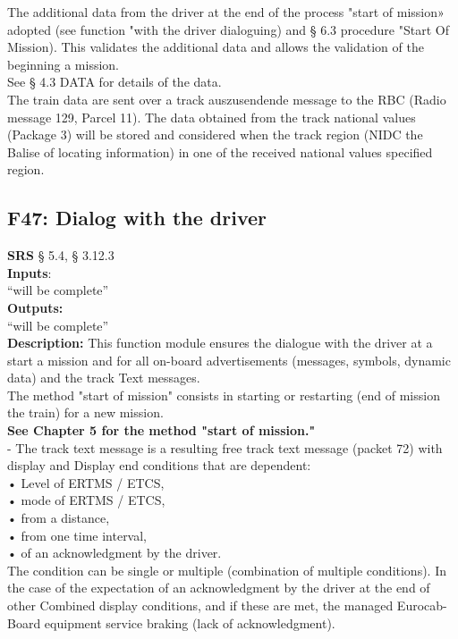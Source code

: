 \documentclass{template/openetcs_report}
\begin{document}
The additional data from the driver at the end of the process "start of mission» 
adopted (see function "with the driver dialoguing) and § 6.3 procedure 
"Start Of Mission). This validates the additional data and allows the validation of the beginning 
a mission. \\

See § 4.3 DATA for details of the data. \\
The train data are sent over a track auszusendende message to the RBC 
(Radio message 129, Parcel 11). 
The data obtained from the track national values ​​(Package 3) will be stored and 
considered when the track region (NIDC the Balise of locating information) in one of the 
received national values ​​specified region.\\

\subsection {F47: Dialog with the driver}
\textbf{SRS} § 5.4, § 3.12.3\\

\textbf{Inputs}:\\
``will be complete''\\
 
 \textbf{Outputs:}\\
 ``will be complete''\\
 
 \textbf{Description:} 
This function module ensures the dialogue with the driver at a start 
a mission and for all on-board advertisements (messages, symbols, dynamic data) and the track 
Text messages. \\

The method "start of mission" consists in starting or restarting (end of mission 
the train) for a new mission. \\

\textbf{See Chapter 5 for the method "start of mission."} \\

- The track text message is a resulting free track text message (packet 72) with display and
Display end conditions that are dependent: \\
    • Level of ERTMS / ETCS, \\
    • mode of ERTMS / ETCS, \\
    • from a distance, \\
    • from one time interval, \\ 
    • of an acknowledgment by the driver. \\
The condition can be single or multiple (combination of multiple conditions). 
In the case of the expectation of an acknowledgment by the driver at the end of other 
Combined display conditions, and if these are met, the managed Eurocab- 
Board equipment service braking (lack of acknowledgment). \\
\end{document}
